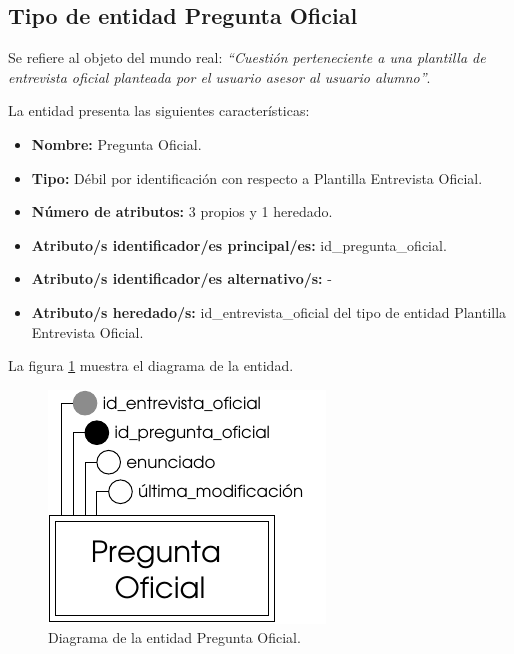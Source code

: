 \subsection{Tipo de entidad Pregunta Oficial}

   \begin{description}

   \item[Definición] Se refiere al objeto del mundo real: \emph{``Cuestión
   perteneciente a una plantilla de entrevista oficial planteada por el usuario
   asesor al usuario alumno''}.

   \item[Características] La entidad presenta las siguientes características:
      \begin{itemize}
         \item \textbf{Nombre:} Pregunta Oficial.
         \item \textbf{Tipo:} Débil por identificación con respecto a
         Plantilla Entrevista Oficial.
         \item \textbf{Número de atributos:} 3 propios y 1 heredado.
         \item \textbf{Atributo/s identificador/es principal/es:} id\_pregunta\_oficial.
         \item \textbf{Atributo/s identificador/es alternativo/s:} -
         \item \textbf{Atributo/s heredado/s:} id\_entrevista\_oficial del tipo
         de entidad Plantilla Entrevista Oficial.
      \end{itemize}

   \item[Diagrama] La figura \ref{diagramaPregOfi} muestra el diagrama de la entidad.
   \item \begin{figure}[!ht]
            \begin{center}
            \includegraphics[]{07.Modelo_Entidad-Interrelacion/7.2.Analisis_Entidades/diagramas/preg_ofi.pdf}
            \caption{Diagrama de la entidad Pregunta Oficial.}
            \label{diagramaPregOfi}
            \end{center}
         \end{figure}


\end{description}
